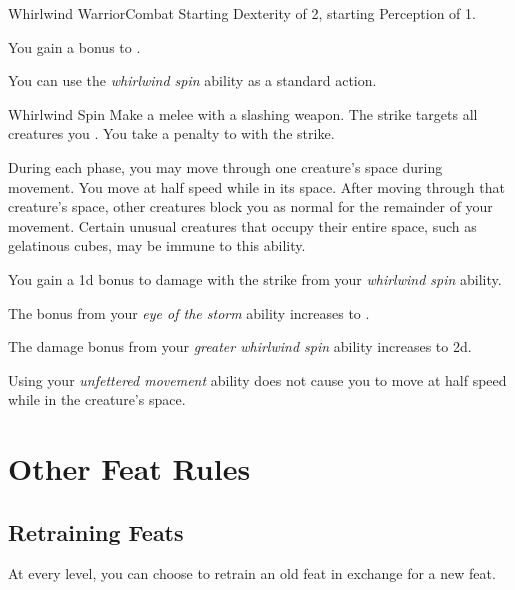     \begin{feat}{Whirlwind Warrior}{Combat}
        \featpres Starting Dexterity of 2, starting Perception of 1.

         You gain a  bonus to .

         You can use the \textit{whirlwind spin} ability as a standard action.
        \begin{apability}{Whirlwind Spin}
            Make a melee  with a slashing weapon.
            The strike targets all creatures you .
            You take a  penalty to  with the strike.
        \end{apability}

         During each phase, you may move through one creature's space during movement.
        You move at half speed while in its space.
        After moving through that creature's space, other creatures block you as normal for the remainder of your movement.
        Certain unusual creatures that occupy their entire space, such as gelatinous cubes, may be immune to this ability.

         You gain a \plus1d bonus to damage with the strike from your \textit{whirlwind spin} ability.

         The bonus from your \textit{eye of the storm} ability increases to .

         The damage bonus from your \textit{greater whirlwind spin} ability increases to \plus2d.

         Using your \textit{unfettered movement} ability does not cause you to move at half speed while in the creature's space.
    \end{feat}

\section{Other Feat Rules}

    \subsection{Retraining Feats}
        At every level, you can choose to retrain an old feat in exchange for a new feat.
